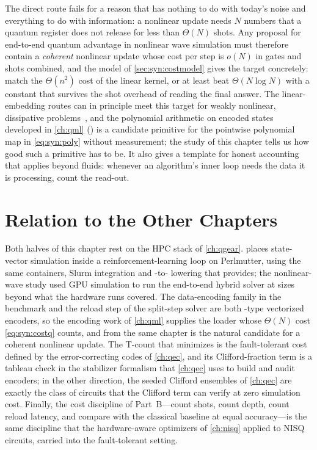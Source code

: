 The direct route fails for a reason that has nothing to do with today's noise and everything to do with information: a nonlinear update needs $N$ numbers that a quantum register does not release for less than $\Theta(N)$ shots. Any proposal for end-to-end quantum advantage in nonlinear wave simulation must therefore contain a \emph{coherent} nonlinear update whose cost per step is $o(N)$ in gates and shots combined, and the model of \cref{sec:syn:costmodel} gives the target concretely: match the $\Theta(n^{2})$ cost of the linear kernel, or at least beat $\Theta(N\log N)$ with a constant that survives the shot overhead of reading the final answer. The linear-embedding routes can in principle meet this target for weakly nonlinear, dissipative problems~\cite{liu2021carleman}, and the polynomial arithmetic on encoded states developed in \cref{ch:qml} (\nnqa{}) is a candidate primitive for the pointwise polynomial map in \cref{eq:syn:poly} without measurement; the study of this chapter tells us how good such a primitive has to be. It also gives a template for honest accounting that applies beyond fluids: whenever an algorithm's inner loop needs the data it is processing, count the read-out.

\section{Relation to the Other Chapters}\label{sec:syn:relation}

Both halves of this chapter rest on the HPC stack of \cref{ch:qgear}. \rubriq{} places \cudaq{} state-vector simulation inside a reinforcement-learning loop on Perlmutter, using the same containers, Slurm integration and \qiskit{}-to-\cudaq{} lowering that \qgear{} provides; the nonlinear-wave study used GPU simulation to run the end-to-end hybrid solver at sizes beyond what the hardware runs covered. The data-encoding family in the \rubriq{} benchmark and the reload step of the split-step solver are both \qcrank{}-type vectorized encoders, so the encoding work of \cref{ch:qml} supplies the loader whose $\Theta(N)$ cost \cref{eq:syn:costq} counts, and \nnqa{} from the same chapter is the natural candidate for a coherent nonlinear update. The T-count that \rubriq{} minimizes is the fault-tolerant cost defined by the error-correcting codes of \cref{ch:qec}, and its Clifford-fraction term is a tableau check in the stabilizer formalism that \cref{ch:qec} uses to build and audit encoders; in the other direction, the seeded Clifford ensembles of \cref{ch:qec} are exactly the class of circuits that the Clifford term can verify at zero simulation cost. Finally, the cost discipline of Part~B---count shots, count depth, count reload latency, and compare with the classical baseline at equal accuracy---is the same discipline that the hardware-aware optimizers of \cref{ch:nisq} applied to NISQ circuits, carried into the fault-tolerant setting.


